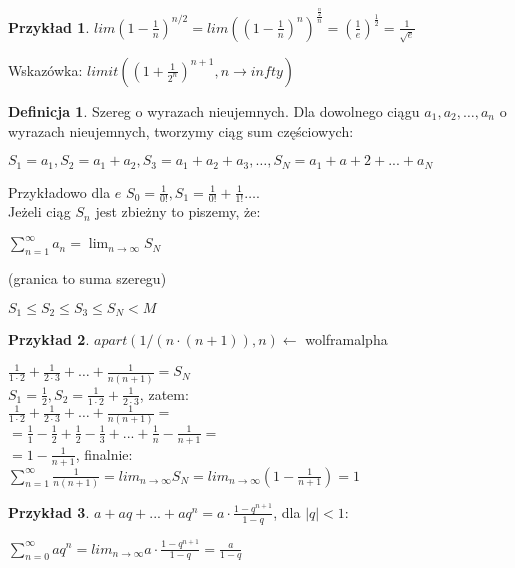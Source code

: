 \documentclass{article}
\theoremstyle{definition}
\newtheorem{de}{Definicja}[subsection]
\theoremstyle{definition}
\theoremstyle{definition}
\newtheorem{pk}{Przykład}[subsection]
\theoremstyle{definition}
\begin{document}
\begin{pk}
    $lim (1-\frac{1}{n})^{n/2}=lim \left((1-\frac{1}{n})^n\right)^{\frac{\frac{n}{2}}{n}}=(\frac{1}{e})^{\frac{1}{2}}=\frac{1}{\sqrt{e}}$
\end{pk}

Wskazówka: $limit\left((1+\frac{1}{2^n})^{n+1},n\rightarrow infty\right)$

\begin{de}
Szereg o wyrazach nieujemnych. Dla dowolnego ciągu $a_1, a_2, \dots, a_n$ o wyrazach nieujemnych,
tworzymy ciąg sum częściowych:
\begin{center}
$S_1=a_1, S_2=a_1+a_2, S_3=a_1+a_2+a_3, \dots, S_N=a_1+a+2+...+a_N$
\end{center}

Przykładowo dla $e$ $S_0=\frac{1}{0!}, S_1=\frac{1}{0!}+\frac{1}{1!}\dots$.\\
Jeżeli ciąg $S_n$ jest zbieżny to piszemy, że:
\begin{center}
$\sum_{n=1}^{\infty} a_n = \lim_{n\rightarrow \infty} S_N$
\end{center}
(granica to suma szeregu)
\begin{center}
    $S_1\leq S_2\leq S_3\leq S_N < M$
\end{center}
\end{de}

\begin{pk}
    $apart(1/(n\cdot(n+1)),n)\leftarrow$ wolframalpha
    \begin{center}
    $\frac{1}{1\cdot 2} + \frac{1}{2\cdot 3}+ \dots + \frac{1}{n(n+1)}=S_N$\\
    $S_1=\frac{1}{2}, S_2=\frac{1}{1\cdot 2}+\frac{1}{2\cdot 3}$, zatem:\\
    $\frac{1}{1\cdot 2} + \frac{1}{2\cdot 3}+ \dots + \frac{1}{n(n+1)}=$\\
    $=\frac{1}{1} - \frac{1}{2} + \frac{1}{2} - \frac{1}{3} + ... + \frac{1}{n} - \frac{1}{n+1}=$\\
    $=1-\frac{1}{n+1}$, finalnie:\\
    $\sum_{n=1}^{\infty} \frac{1}{n(n+1)} = lim_{n\rightarrow \infty} S_N = lim_{n\rightarrow \infty} (1 - \frac{1}{n+1}) = 1$
    \end{center}
\end{pk}

\begin{pk}
    $a+aq+...+aq^n=a\cdot \frac{1-q^{n+1}}{1-q}$, dla $|q|<1$:
    \begin{center}
    $\sum_{n=0}^{\infty} aq^n = lim_{n\rightarrow \infty} a\cdot \frac{1-q^{n+1}}{1-q} = \frac{a}{1-q}$
    \end{center}
\end{pk}
\end{document}
